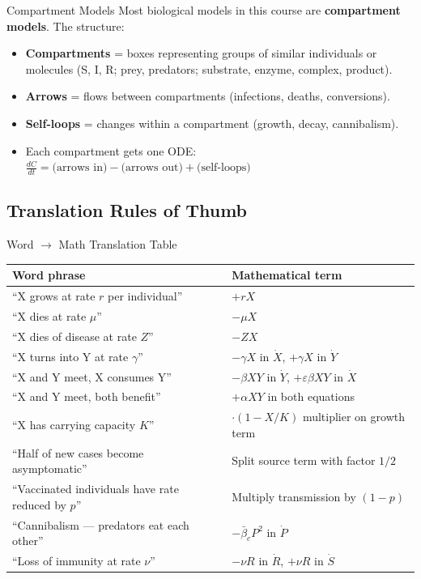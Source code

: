 \documentclass[11pt]{article}
\begin{document}
\begin{conceptbox}{Compartment Models}
Most biological models in this course are \textbf{compartment models}. The structure:
\begin{itemize}
\item \textbf{Compartments} = boxes representing groups of similar individuals or molecules (S, I, R; prey, predators; substrate, enzyme, complex, product).
\item \textbf{Arrows} = flows between compartments (infections, deaths, conversions).
\item \textbf{Self-loops} = changes within a compartment (growth, decay, cannibalism).
\item Each compartment gets one ODE: $\frac{dC}{dt} = \text{(arrows in)} - \text{(arrows out)} + \text{(self-loops)}$
\end{itemize}
\end{conceptbox}

\subsection{Translation Rules of Thumb}

\begin{summarybox}{Word $\to$ Math Translation Table}
\renewcommand{\arraystretch}{1.4}
\begin{tabular}{p{6cm}p{8cm}}
\toprule
\textbf{Word phrase} & \textbf{Mathematical term}\\
\midrule
``X grows at rate $r$ per individual'' & $+rX$\\
``X dies at rate $\mu$'' & $-\mu X$\\
``X dies of disease at rate $Z$'' & $-ZX$\\
``X turns into Y at rate $\gamma$'' & $-\gamma X$ in $\dot X$, $+\gamma X$ in $\dot Y$\\
``X and Y meet, X consumes Y'' & $-\beta XY$ in $\dot Y$, $+\varepsilon\beta XY$ in $\dot X$\\
``X and Y meet, both benefit'' & $+\alpha XY$ in both equations\\
``X has carrying capacity $K$'' & $\cdot(1-X/K)$ multiplier on growth term\\
``Half of new cases become asymptomatic'' & Split source term with factor $1/2$\\
``Vaccinated individuals have rate reduced by $p$'' & Multiply transmission by $(1-p)$\\
``Cannibalism --- predators eat each other'' & $-\bar\beta_c P^2$ in $\dot P$\\
``Loss of immunity at rate $\nu$'' & $-\nu R$ in $\dot R$, $+\nu R$ in $\dot S$\\
\bottomrule
\end{tabular}
\end{summarybox}
\end{document}
